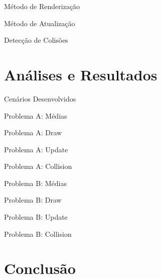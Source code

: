 \documentclass{beamer}
\begin{document}
\begin{frame}[t]{Método de Renderização}
\end{frame}

\begin{frame}[t]{Método de Atualização}
\end{frame}

\begin{frame}[t]{Detecção de Colisões}
\end{frame}

\section{Análises e Resultados}

\frame{\tableofcontents[currentsection]}

\begin{frame}[t]{Cenários Desenvolvidos}
\end{frame}

\begin{frame}[t]{Problema A: Médias}
\end{frame}

\begin{frame}[t]{Problema A: Draw}
\end{frame}

\begin{frame}[t]{Problema A: Update}
\end{frame}

\begin{frame}[t]{Problema A: Collision}
\end{frame}

\begin{frame}[t]{Problema B: Médias}
\end{frame}

\begin{frame}[t]{Problema B: Draw}
\end{frame}

\begin{frame}[t]{Problema B: Update}
\end{frame}

\begin{frame}[t]{Problema B: Collision}
\end{frame}

\section{Conclusão}

\frame{\tableofcontents[currentsection]}
\end{document}
